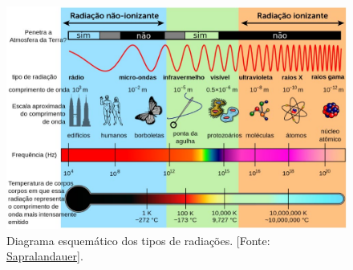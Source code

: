 \begin{figure}[H]
            \centering
			\includegraphics[width=0.9\linewidth]{Figuras/Artigo3/radiacao.jpg}
			\caption{Diagrama esquemático dos tipos de radiações. [Fonte: \href{https://www.sapralandauer.com.br/protecao-radiologica-saiba-sobre-os-principais-aspectos-normas-e-tecnologias-empregadas/o-que-e-radiacao-nocoes-basicas-de-protecao-radiologica/\#toggle-id-2}{Sapralandauer}].}
			\label{fig:DiagramaEsq}
\end{figure}

